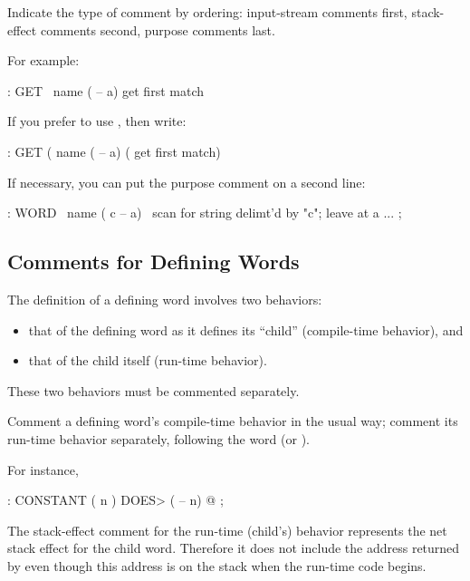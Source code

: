 \begin{tip}
Indicate the type of comment by ordering: input-stream comments first,
stack-effect comments second, purpose comments last.
\end{tip}
For example:
\begin{Code}
: GET   \   name   ( -- a)   get first match
\end{Code}
If you prefer to use \forth{(}, then write:
\begin{Code}
: GET   (   name  ( -- a)    ( get first match)
\end{Code}
If necessary, you can put the purpose comment on a second line:
\begin{Code}
: WORD   \   name   ( c -- a)
   \ scan for string delimt'd by "c"; leave at a
   ...  ;
\end{Code}
%

\subsection{Comments for Defining Words}%
The definition of a defining word involves two behaviors:

\begin{itemize}
\item that of the defining word as it defines its ``child''
(compile-time behavior), and
\item that of the child itself (run-time behavior).
\end{itemize}
These two behaviors must be commented separately.

%
\begin{tip}
Comment a defining word's compile-time behavior in the usual way;
comment its run-time behavior separately, following the word
 (or ).
\end{tip}
For instance,
\begin{Code}
: CONSTANT  ( n )
   DOES>  ( -- n)  @ ;
\end{Code}
The stack-effect comment for the run-time (child's) behavior
represents the net stack effect for the child word.  Therefore it does
not include the address returned by  even though this
address is on the stack when the run-time code begins.

